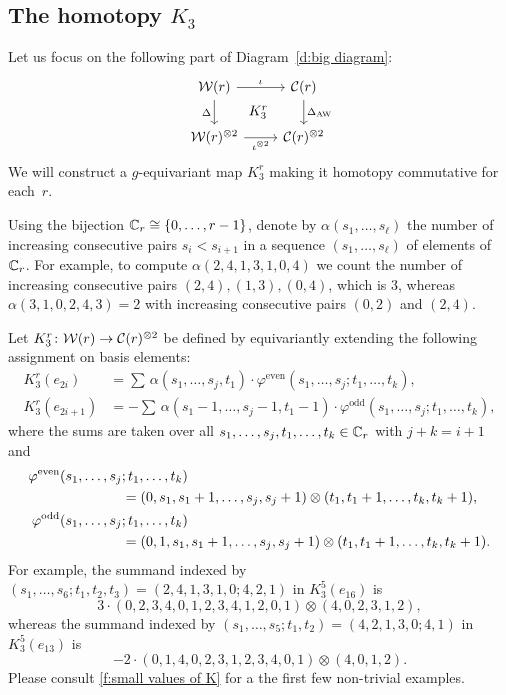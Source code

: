 \subsection{The homotopy $K_3$}\label{ss:coproduct}

Let us focus on the following part of Diagram~\eqref{d:big diagram}:
\[
\begin{tikzcd}
	\cW(r)
	\arrow[r,"\iota"]
	\arrow[d,"\Delta"']
	\arrow[dr,phantom,"K_3^r"]
	& \cC(r)
	\arrow[d,"\Delta_{\AW}"] \\
	\cW(r)^{\ot 2}
	\arrow[r,"\iota^{\ot 2}"']
	& \cC(r)^{\ot 2}
\end{tikzcd}
\]
We will construct a $g$-equivariant map $K_3^r$ making it homotopy commutative for each~$r$.

Using the bijection $\mathbb{C}_r \cong \{0,\dots,r-1\}$, denote by $\alpha(s_1,\dots,s_\ell)$ the number of increasing consecutive pairs $s_i < s_{i+1}$ in a sequence $(s_1,\ldots,s_\ell)$ of elements of $\mathbb{C}_r$.
For example, to compute $\alpha(2,4,1,3,1,0,4)$ we count the number of increasing consecutive pairs $(2,4),(1,3),(0,4)$, which is $3$, whereas $\alpha(3,1,0,2,4,3) = 2$ with increasing consecutive pairs $(0,2)$ and $(2,4)$.

Let $K_3^r \colon \mathcal{W}(r) \to \mathcal{C}(r)^{\otimes 2}$ be defined by equivariantly extending the following assignment on basis elements:
\[
\begin{split}
	K_3^r(e_{2i}) &= \sum \, \alpha(s_1,\ldots,s_j,t_1)\cdot\varphi^{\mathrm{even}}(s_1,\dots,s_j;t_1,\dots,t_k), \\
	K_3^r(e_{2i+1}) &= -\sum \, \alpha(s_1-1,\ldots,s_j-1,t_1-1)\cdot \varphi^{\mathrm{odd}}(s_1,\dots,s_j;t_1,\dots,t_k),
\end{split}
\]
where the sums are taken over all $s_1,\dots,s_j,t_1,\dots,t_k \in \mathbb{C}_r$ with $j+k = i+1$ and
\begin{align*}
	\varphi^{\mathrm{even}}(s_1,\dots,s_j&;t_1,\dots,t_k) \\ &=
	(0,s_1,s_1+1,\dots,s_j,s_j+1) \otimes (t_1,t_1+1,\dots,t_k,t_k+1), \\
	\varphi^{\mathrm{odd}}(s_1,\dots,s_j&;t_1,\dots,t_k) \\ &=
	(0,1,s_1,s_1+1,\dots,s_j,s_j+1) \otimes (t_1,t_1+1,\dots,t_k,t_k+1).
\end{align*}
For example, the summand indexed by $(s_1,\ldots,s_6;t_1,t_2,t_3) = (2,4,1,3,1,0;4,2,1)$ in $K_3^5(e_{16})$ is
\[
3 \cdot (0,2,3,4,0,1,2,3,4,1,2,0,1) \otimes (4,0,2,3,1,2),
\]
whereas the summand indexed by $(s_1,\ldots,s_5;t_1,t_2) =(4,2,1,3,0;4,1)$ in $K_3^5(e_{13})$ is
\[
-2 \cdot (0,1,4,0,2,3,1,2,3,4,0,1) \otimes (4,0,1,2).
\]
Please consult \cref{f:small values of K} for a the first few non-trivial examples.

